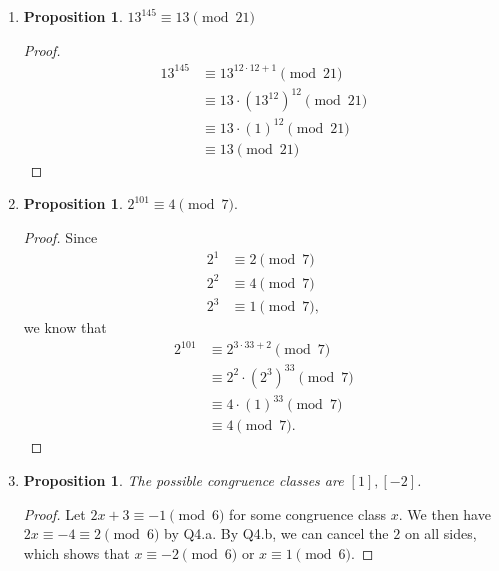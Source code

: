 \documentclass{article}
\newtheorem{prop}[thm]{Proposition}
\begin{document}
\begin{enumerate}
\begin{enumerate}
\begin{proof}
    Therefore, $a^m \equiv b^m \pmod{n}$ for all $m \in \mathbb{Z}_{> 0}$.
\end{proof}
\end{enumerate}

\item 
\begin{prop}
   $13^{145} \equiv 13 \pmod{21}$
\end{prop}
\begin{proof}
    \begin{align}
        13^{145} &\equiv 13^{12\cdot12 + 1} \pmod{21} \\
                 &\equiv 13\cdot(13^{12})^{12} \pmod{21}\\
                 &\equiv 13\cdot(1)^{12} \pmod{21} \\
                 &\equiv 13 \pmod{21}
    \end{align}
\end{proof}

\item 
\begin{prop}
    $2^{101} \equiv 4 \pmod{7}.$
\end{prop}
\begin{proof}
    Since
    \begin{align}
        2^1 &\equiv 2 \pmod{7} \\
        2^2 &\equiv 4 \pmod{7} \\
        2^3 &\equiv 1 \pmod{7}, 
    \end{align}
    we know that 
    \begin{align}
        2^{101} &\equiv 2^{3\cdot33 + 2} \pmod{7} \\
                &\equiv 2^2\cdot(2^{3})^{33} \pmod{7} \\
                &\equiv 4\cdot(1)^{33} \pmod{7} \\
                &\equiv 4 \pmod{7}.
    \end{align}
\end{proof}

\item 
\begin{prop}
    The possible congruence classes are $[1], [-2]$.
\end{prop}
\begin{proof}
    Let $2x + 3 \equiv -1 \pmod{6}$ for some congruence class $x$. We then have $2x \equiv -4 \equiv 2 \pmod{6}$ by Q4.a. By Q4.b, we can cancel the $2$ on all sides, which shows that $x \equiv -2 \pmod{6}$ or $x \equiv 1 \pmod{6}$. 


\end{proof}
\end{enumerate}
\end{document}
